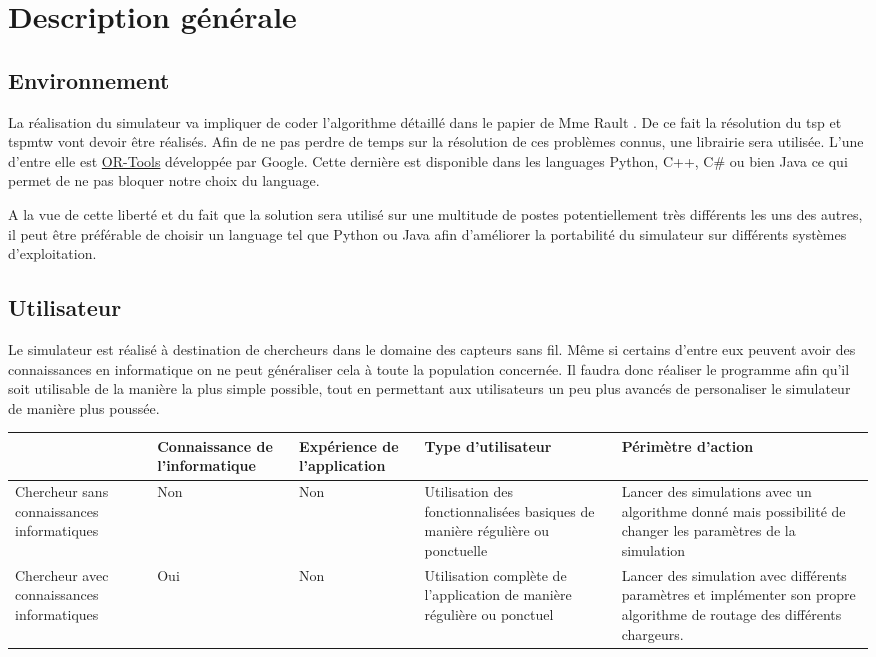 \documentclass[noposter,final]{polytech/polytech}
\begin{document}
\chapter{Description générale}
	\section{Environnement}
		La réalisation du simulateur va impliquer de coder l'algorithme détaillé dans le papier de Mme Rault \cite{Rault:chargers}.
		De ce fait la résolution du \gls{tsp} et \gls{tspmtw} vont devoir être réalisés.
		Afin de ne pas perdre de temps sur la résolution de ces problèmes connus, une librairie sera utilisée.
		L'une d'entre elle est \href{https://developers.google.com/optimization/}{OR-Tools} développée par Google.
		Cette dernière est disponible dans les languages Python, C++, C\# ou bien Java ce qui permet de ne pas bloquer notre choix du language.
		
		A la vue de cette liberté et du fait que la solution sera utilisé sur une multitude de postes potentiellement très différents les uns des autres, il peut être préférable de choisir un language tel que Python ou Java afin d'améliorer la portabilité du simulateur sur différents systèmes d'exploitation.
	
	\section{Utilisateur\label{sec:users}}
		Le simulateur est réalisé à destination de chercheurs dans le domaine des capteurs sans fil.
		Même si certains d'entre eux peuvent avoir des connaissances en informatique on ne peut généraliser cela à toute la population concernée.
		Il faudra donc réaliser le programme afin qu'il soit utilisable de la manière la plus simple possible, tout en permettant aux utilisateurs un peu plus avancés de personaliser le simulateur de manière plus poussée.
		
		\begin{center}
			\centering
			\begin{tabularx}{\textwidth}{|X||X|X|X|X|}
				\hline
				& Connaissance de l'informatique & Expérience de l'application & Type d'utilisateur & Périmètre d'action\\\hline\hline
				Chercheur sans connaissances informatiques & Non & Non & Utilisation des fonctionnalisées basiques de manière régulière ou ponctuelle & Lancer des simulations avec un algorithme donné mais possibilité de changer les paramètres de la simulation\\\hline
				Chercheur avec connaissances informatiques & Oui & Non & Utilisation complète de l'application de manière régulière ou ponctuel & Lancer des simulation avec différents paramètres et implémenter son propre algorithme de routage des différents chargeurs.\\\hline
			\end{tabularx}
		\end{center}
\end{document}
